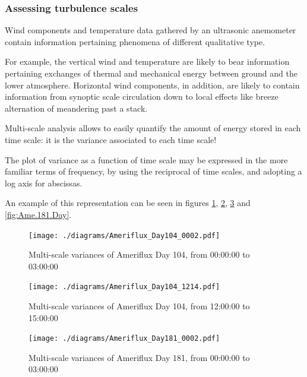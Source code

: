 \documentclass[a4paper,10pt]{book}
\begin{document}
\subsubsection{Assessing turbulence scales}

Wind components and temperature data gathered by an ultrasonic anemometer contain information pertaining phenomena of different qualitative type.

For example, the vertical wind and temperature are likely to bear information pertaining exchanges of thermal and mechanical energy between ground and the lower atmosphere. Horizontal wind components, in addition, are likely to contain information from synoptic scale circulation down to local effects like breeze alternation of meandering past a stack.

Multi-scale analysis allows to easily quantify the amount of energy stored in each time scale: it is the variance associated to each time scale!

The plot of variance as a function of time scale may be expressed in the more familiar terms of frequency, by using the reciprocal of time scales, and adopting a log axis for abscissas.

An example of this representation can be seen in figures \ref{fig:Ame.104.Night}, \ref{fig:Ame.104.Day}, \ref{fig:Ame.181.Night} and \ref{fig:Ame.181.Day}.

\begin{figure}[htp]
 \centering
 \begin{center}
 \texttt{[image: ./diagrams/Ameriflux\_Day104\_0002.pdf]}
 \end{center}
 \caption{Multi-scale variances of Ameriflux Day 104, from 00:00:00 to 03:00:00}
 \label{fig:Ame.104.Night}
\end{figure}

\begin{figure}[htp]
 \centering
 \begin{center}
 \texttt{[image: ./diagrams/Ameriflux\_Day104\_1214.pdf]}
 \end{center}
 \caption{Multi-scale variances of Ameriflux Day 104, from 12:00:00 to 15:00:00}
 \label{fig:Ame.104.Day}
\end{figure}

\begin{figure}[htp]
 \centering
 \begin{center}
 \texttt{[image: ./diagrams/Ameriflux\_Day181\_0002.pdf]}
 \end{center}
 \caption{Multi-scale variances of Ameriflux Day 181, from 00:00:00 to 03:00:00}
 \label{fig:Ame.181.Night}
\end{figure}
\end{document}

